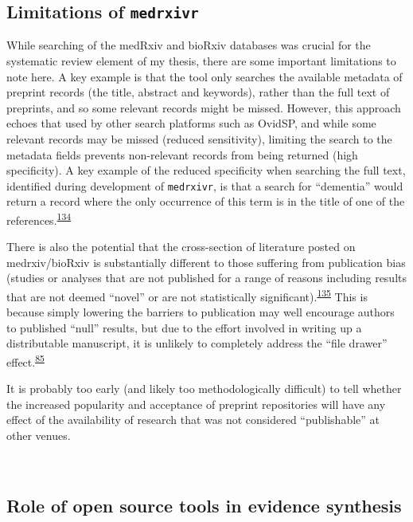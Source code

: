 \documentclass[a4paper, twoside]{templates/ociamthesis}
\begin{document}
~

\hypertarget{medrxivr-limitations}{%
\subsection{\texorpdfstring{Limitations of \texttt{medrxivr}}{Limitations of medrxivr}}\label{medrxivr-limitations}}

While searching of the medRxiv and bioRxiv databases was crucial for the systematic review element of my thesis, there are some important limitations to note here. A key example is that the tool only searches the available metadata of preprint records (the title, abstract and keywords), rather than the full text of preprints, and so some relevant records might be missed. However, this approach echoes that used by other search platforms such as OvidSP, and while some relevant records may be missed (reduced sensitivity), limiting the search to the metadata fields prevents non-relevant records from being returned (high specificity). A key example of the reduced specificity when searching the full text, identified during development of \texttt{medrxivr}, is that a search for ``dementia'' would return a record where the only occurrence of this term is in the title of one of the references.\textsuperscript{\protect\hyperlink{ref-bong2019}{134}}

There is also the potential that the cross-section of literature posted on medrxiv/bioRxiv is substantially different to those suffering from publication bias (studies or analyses that are not published for a range of reasons including results that are not deemed ``novel'' or are not statistically significant).\textsuperscript{\protect\hyperlink{ref-song2010}{135}} This is because simply lowering the barriers to publication may well encourage authors to published ``null'' results, but due to the effort involved in writing up a distributable manuscript, it is unlikely to completely address the ``file drawer'' effect.\textsuperscript{\protect\hyperlink{ref-rosenthal1979}{85}}

It is probably too early (and likely too methodologically difficult) to tell whether the increased popularity and acceptance of preprint repositories will have any effect of the availability of research that was not considered ``publishable'' at other venues.

~

\hypertarget{role-of-open-source-tools-in-evidence-synthesis}{%
\subsection{Role of open source tools in evidence synthesis}\label{role-of-open-source-tools-in-evidence-synthesis}}
\end{document}
